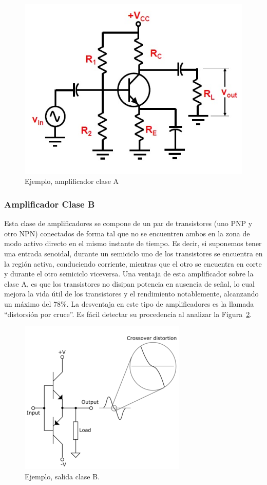 \documentclass[a4paper,12pt,twoside]{article}
\begin{document}
\begin{figure}[H]
\centering
\includegraphics[scale=0.6]{img/Amplificador-clase-a.jpg}
\caption{Ejemplo, amplificador clase A}
\label{ampliA} 
\end{figure}

\medskip 
\subsubsection*{Amplificador Clase B}

Esta clase de amplificadores se compone de un par de transistores (uno PNP y otro NPN) conectados de forma tal que no se encuentren ambos en la zona de modo activo directo en el mismo instante de tiempo. Es decir, si suponemos tener una entrada senoidal, durante un semiciclo uno de los transistores se encuentra en la región activa, conduciendo corriente, mientras que el otro se encuentra en corte y durante el otro semiciclo viceversa.
 Una ventaja de esta amplificador sobre la clase A, es que los transistores no disipan potencia en ausencia de señal, lo cual mejora la vida útil de los transistores y el rendimiento notablemente, alcanzando un máximo del 78\%.
 La desventaja en este tipo de amplificadores es la llamada “distorsión por cruce”. Es fácil detectar su procedencia al analizar la Figura~\ref{ampliB}.

\begin{figure}[H]
\centering
\includegraphics[scale=0.8]{img/ampliB.png}
\caption{Ejemplo, salida clase B.}
\label{ampliB} 
\end{figure}
\end{document}
